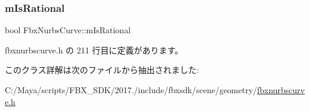 \subsubsection{\texorpdfstring{m\+Is\+Rational}{mIsRational}}
{\footnotesize\ttfamily bool Fbx\+Nurbs\+Curve\+::m\+Is\+Rational}



 fbxnurbscurve.\+h の 211 行目に定義があります。



このクラス詳解は次のファイルから抽出されました\+:\begin{DoxyCompactItemize}
\item 
C\+:/\+Maya/scripts/\+F\+B\+X\+\_\+\+S\+D\+K/2017./include/fbxsdk/scene/geometry/\hyperlink{fbxnurbscurve_8h}{fbxnurbscurve.\+h}\end{DoxyCompactItemize}
